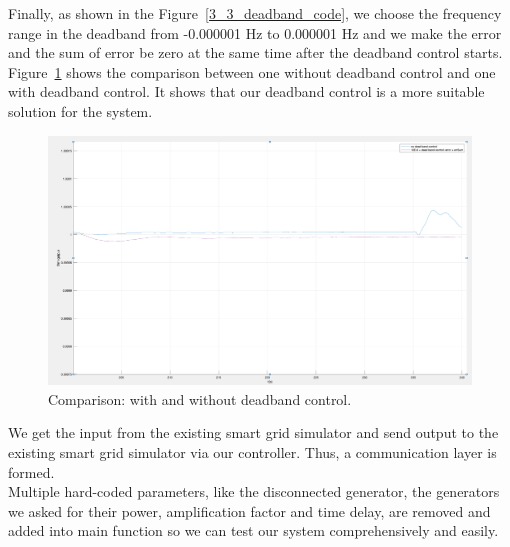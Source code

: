 Finally, as shown in the Figure~\ref{3_3_deadband_code}, we choose the frequency range in the deadband from -0.000001 Hz to 0.000001 Hz and we make the error and the sum of error be zero at the same time after the deadband control starts. Figure~\ref{3_3_deadband_result} shows the comparison between one without deadband control and one with deadband control. It shows that our deadband control is a more suitable solution for the system. 

\begin{figure}[!htbp]
\center
\includegraphics[scale=0.2]{figure/3_3_deadband_result.png}
\caption{Comparison: with and without deadband control.}
\label{3_3_deadband_result}
\end{figure}



We get the input from the existing smart grid simulator and send output to the existing smart grid simulator via our controller. Thus, a communication layer is formed.\\

Multiple hard-coded parameters, like the disconnected generator, the generators we asked for their power, amplification factor and time delay, are removed and added into main function so we can test our system comprehensively and easily. 